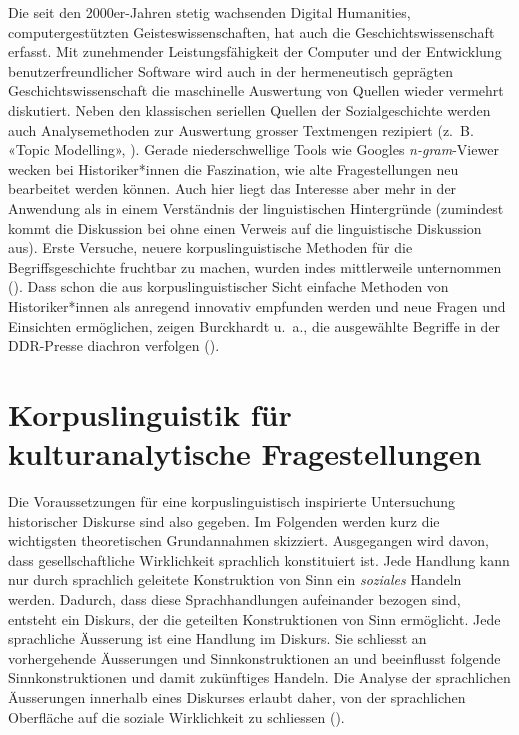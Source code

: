 Die seit den 2000er-Jahren stetig wachsenden Digital Humanities, computergestützten Geisteswissenschaften, hat auch die Geschichtswissenschaft erfasst. Mit zunehmender Leistungsfähigkeit der Computer und der Entwicklung benutzerfreundlicher Software wird auch in der hermeneutisch geprägten Geschichtswissenschaft die maschinelle Auswertung von Quellen wieder vermehrt diskutiert. Neben den klassischen seriellen Quellen der Sozialgeschichte werden auch Analysemethoden zur Auswertung grosser Textmengen rezipiert (z.~B. «Topic Modelling», \cite{graham_getting_2012}). Gerade niederschwellige Tools wie Googles \textit{n-gram}-Viewer wecken bei Historiker*innen die Faszination, wie alte Fragestellungen neu bearbeitet werden können. Auch hier liegt das Interesse aber mehr in der Anwendung als in einem Verständnis der linguistischen Hintergründe (zumindest kommt die Diskussion bei \cite{sarasin_sozialgeschichte_2012} ohne einen Verweis auf die linguistische Diskussion aus). Erste Versuche, neuere korpuslinguistische Methoden für die Begriffsgeschichte fruchtbar zu machen, wurden indes mittlerweile unternommen (\cite{schwandt_digitale_2018, kamper_diskurslinguistik_2018}). Dass schon die aus korpuslinguistischer Sicht einfache Methoden von Historiker*innen als anregend innovativ empfunden werden und neue Fragen und Einsichten ermöglichen, zeigen Burckhardt u.~a., die ausgewählte Begriffe in der DDR-Presse diachron verfolgen (\cite{burckhardt_distant_2019}).


\section{Korpuslinguistik für kulturanalytische Fragestellungen}

Die Voraussetzungen für eine korpuslinguistisch inspirierte Untersuchung historischer Diskurse sind also gegeben. Im Folgenden werden kurz die wichtigsten theoretischen Grundannahmen skizziert. Ausgegangen wird davon, dass gesellschaftliche Wirklichkeit sprachlich konstituiert ist. Jede Handlung kann nur durch sprachlich geleitete Konstruktion von Sinn ein \textit{soziales} Handeln werden. Dadurch, dass diese Sprachhandlungen aufeinander bezogen sind, entsteht ein Diskurs, der die geteilten Konstruktionen von Sinn ermöglicht. Jede sprachliche Äusserung ist eine Handlung im Diskurs. Sie schliesst an vorhergehende Äusserungen und Sinnkonstruktionen an und beeinflusst folgende Sinnkonstruktionen und damit zukünftiges Handeln. Die Analyse der sprachlichen Äusserungen innerhalb eines Diskurses erlaubt daher, von der sprachlichen Oberfläche auf die soziale Wirklichkeit zu schliessen (\cite[63]{lemke_text_2015}).

